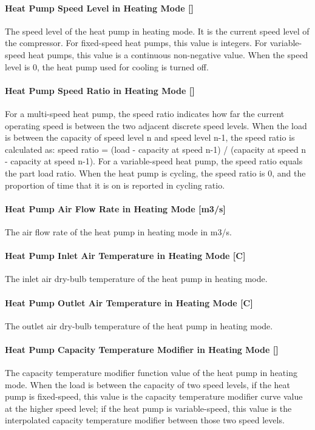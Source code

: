 \paragraph{Heat Pump Speed Level in Heating Mode {[}{]}} The speed level of the
heat pump in heating mode. It is the current speed level of the compressor. For
fixed-speed heat pumps, this value is integers. For variable-speed heat pumps,
this value is a continuous non-negative value. When the speed level is 0,
the heat pump used for cooling is turned off.
\paragraph{Heat Pump Speed Ratio in Heating Mode {[}{]}} For a multi-speed heat pump, the speed ratio
indicates how far the current operating speed is between the two adjacent discrete speed levels.
When the load is between the capacity of speed level n and speed level n-1, the speed ratio is calculated as:
speed ratio = (load - capacity at speed n-1) / (capacity at speed n - capacity at speed n-1).
For a variable-speed heat pump, the speed ratio equals the part load ratio.
When the heat pump is cycling, the speed ratio is 0, and the proportion of time that it is on is reported in cycling ratio.
\paragraph{Heat Pump Air Flow Rate in Heating Mode {[}m3/s{]}}
The air flow rate of the heat pump in heating mode in m3/s.
\paragraph{Heat Pump Inlet Air Temperature in Heating Mode {[}C{]}}
The inlet air dry-bulb temperature of the heat pump in heating mode.
\paragraph{Heat Pump Outlet Air Temperature in Heating Mode {[}C{]}}
The outlet air dry-bulb temperature of the heat pump in heating mode.
\paragraph{Heat Pump Capacity Temperature Modifier in Heating Mode {[}{]}}
The capacity temperature modifier function value of the heat pump in heating
mode. When the load is between the capacity of two speed levels, if the heat
pump is fixed-speed, this value is the capacity temperature modifier curve value
at the higher speed level; if the heat pump is variable-speed, this value is the
interpolated capacity temperature modifier between those two speed levels.
